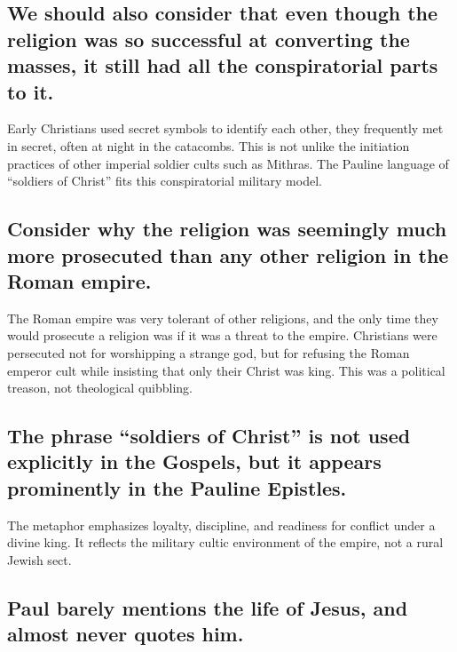 \subsection{We should also consider that even though the religion was so successful at converting the masses, it still had all the conspiratorial parts to it.}\label{subsec:we-should-also-consider-that-even-though-the-religion-was-so-successful-at-converting-the-masses-it-still-had-all-the-conspiratorial-parts-to-it.}

Early Christians used secret symbols to identify each other, they frequently met in secret, often at night in the catacombs.
This is not unlike the initiation practices of other imperial soldier cults such as Mithras.
The Pauline language of ``soldiers of Christ'' fits this conspiratorial military model.

\subsection{Consider why the religion was seemingly much more prosecuted than any other religion in the Roman empire.}\label{subsec:consider-why-the-religion-was-seemingly-much-more-prosecuted-than-any-other-religion-in-the-roman-empire.}

The Roman empire was very tolerant of other religions, and the only time they would prosecute a religion was if it was a threat to the empire.
Christians were persecuted not for worshipping a strange god, but for refusing the Roman emperor cult while insisting that only their Christ was king.
This was a political treason, not theological quibbling.

\subsection{The phrase ``soldiers of Christ'' is not used explicitly in the Gospels, but it appears prominently in the Pauline Epistles.}\label{subsec:the-phrase-soldiers-of-christ-is-not-used-explicitly-in-the-gospels-but-it-appears-prominently-in-the-pauline-epistles-particularly-in-the-context-of-the-christian-life-being-compared-to-a-military-struggle-or-a-spiritual-battle.}

The metaphor emphasizes loyalty, discipline, and readiness for conflict under a divine king.
It reflects the military cultic environment of the empire, not a rural Jewish sect.

\subsection{Paul barely mentions the life of Jesus, and almost never quotes him.}\label{subsec:paul-barely-mentions-the-life-of-jesus-and-almost-never-quotes-him.}

